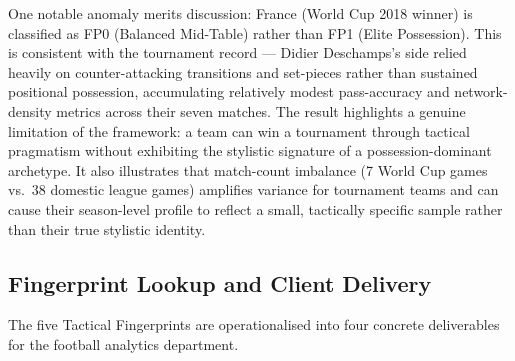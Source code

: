 \documentclass[runningheads]{llncs}
\begin{document}
One notable anomaly merits discussion: France (World Cup 2018 winner) is classified as FP0 (Balanced Mid-Table) rather than FP1 (Elite Possession). This is consistent with the tournament record --- Didier Deschamps's side relied heavily on counter-attacking transitions and set-pieces rather than sustained positional possession, accumulating relatively modest pass-accuracy and network-density metrics across their seven matches. The result highlights a genuine limitation of the framework: a team can win a tournament through tactical pragmatism without exhibiting the stylistic signature of a possession-dominant archetype. It also illustrates that match-count imbalance (7 World Cup games vs.\ 38 domestic league games) amplifies variance for tournament teams and can cause their season-level profile to reflect a small, tactically specific sample rather than their true stylistic identity.

\subsection{Fingerprint Lookup and Client Delivery}
\label{sec:delivery}

The five Tactical Fingerprints are operationalised into four concrete deliverables for the football analytics department.
\end{document}
